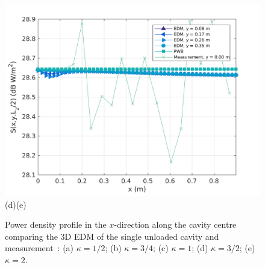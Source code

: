 \documentclass[a4paper]{article}
\numberwithin{equation}{section}
\begin{document}
\begin{figure}[hp]
\begin{center}
\includegraphics[width=0.49\linewidth]{figures/SDM_3D_SU_PowerDensityProfileXMeas_JX_k2_0}\\
{\footnotesize (d)\hspace{75mm}(e)}\\
\vspace{-2mm}
\caption{\label{fg:measprofssuk} Power density profile in the $x$-direction along the cavity centre comparing
the 3D EDM of the single unloaded cavity and measurement~\citep{Flintoft2017b}: (a) $\kappa=1/2$; (b) $\kappa=3/4$;
(c) $\kappa=1$; (d) $\kappa=3/2$; (e) $\kappa=2$.}
\end{center}
\end{figure}
\end{document}
